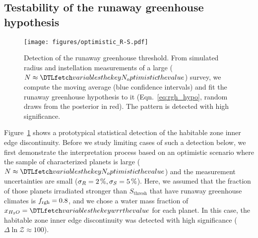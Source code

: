 \documentclass[twocolumn,twocolappendix]{aastex631}
\begin{document}
\subsection{Testability of the runaway greenhouse hypothesis}\label{sec:res_testability}
\begin{figure}[ht!]
    \begin{centering}
        \texttt{[image: figures/optimistic\_R-S.pdf]}
        \caption{
        Detection of the runaway greenhouse threshold.
        From simulated radius and instellation measurements of a large ($N \approx \var{N_optimistic}$) survey, we compute the moving average (blue confidence intervals) and fit the runaway greenhouse hypothesis to it (Eqn.~\ref{eq:rgh_hypo}, random draws from the posterior in red).
            The pattern is detected with high significance.
        }
        \label{fig:optimistic_R-S}
    \end{centering}
\end{figure}
Figure~\ref{fig:optimistic_R-S} shows a prototypical statistical detection of the habitable zone inner edge discontinuity.
Before we study limiting cases of such a detection below, we first demonstrate the interpretation process based on an optimistic scenario where the sample of characterized planets is large ($N \approx \var{N_optimistic}$) and the measurement uncertainties are small ($\sigma_{R} = \SI{2}{\percent}, \sigma_{S} = \SI{5}{\percent}$).
Here, we assumed that the fraction of those planets irradiated stronger than $S_\mathrm{thresh}$ that have runaway greenhouse climates is $f_\mathrm{rgh} = 0.8$, and we chose a water mass fraction of $x_{H_2O} = \var{wrr}$ for each planet.
In this case, the habitable zone inner edge discontinuity was detected with high significance ($\Delta \ln \mathcal{Z} \approx 100$).
\end{document}

